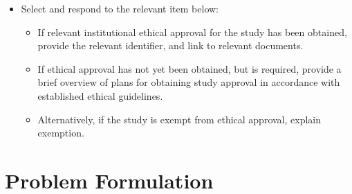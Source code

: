 \documentclass[
]{article}
\providecommand{\tightlist}{%
  \setlength{\itemsep}{0pt}\setlength{\parskip}{0pt}}
\begin{document}
\begin{tcolorbox}[enhanced jigsaw, opacitybacktitle=0.6, bottomrule=.15mm, leftrule=.75mm, rightrule=.15mm, colbacktitle=quarto-callout-caution-color!10!white, toprule=.15mm, titlerule=0mm, left=2mm, colframe=quarto-callout-caution-color-frame, breakable, title=\textcolor{quarto-callout-caution-color}{\faFire}\hspace{0.5em}{Preregistration Item}, opacityback=0, coltitle=black, bottomtitle=1mm, colback=white, toptitle=1mm, arc=.35mm]

\begin{itemize}
\tightlist
\item[$\square$]
  Select and respond to the relevant item below:

  \begin{itemize}
  \tightlist
  \item
    If relevant institutional ethical approval for the study has been
    obtained, provide the relevant identifier, and link to relevant
    documents.
  \item
    If ethical approval has not yet been obtained, but is required,
    provide a brief overview of plans for obtaining study approval in
    accordance with established ethical guidelines.
  \item
    Alternatively, if the study is exempt from ethical approval, explain
    exemption.
  \end{itemize}
\end{itemize}

\end{tcolorbox}

\section{Problem Formulation}\label{sec-problem-formulation}
\end{document}
